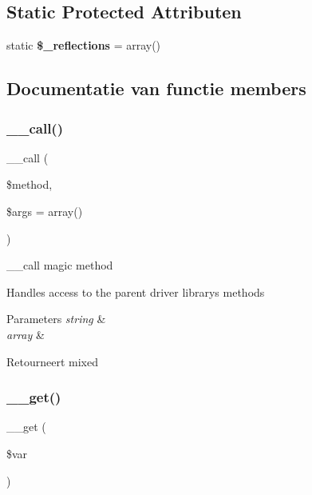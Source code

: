 \subsection*{Static Protected Attributen}
\begin{DoxyCompactItemize}
\item 
\mbox{\label{class_c_i___driver_a3eae4dfd334261dd94fe0e148501513f}} 
static {\bfseries \$\+\_\+reflections} = array()
\end{DoxyCompactItemize}


\subsection{Documentatie van functie members}
\mbox{\label{class_c_i___driver_a57936fde7f1adea3f3e7dfca474a1786}} 
\subsubsection{\texorpdfstring{\_\_call()}{\_\_call()}}
{\footnotesize\ttfamily \+\_\+\+\_\+call (\begin{DoxyParamCaption}\item[{}]{\$method,  }\item[{}]{\$args = {\ttfamily array()} }\end{DoxyParamCaption})}

\+\_\+\+\_\+call magic method

Handles access to the parent driver library\textquotesingle{}s methods


\begin{DoxyParams}{Parameters}
{\em string} & \\
\hline
{\em array} & \\
\hline
\end{DoxyParams}
\begin{DoxyReturn}{Retourneert}
mixed 
\end{DoxyReturn}
\mbox{\label{class_c_i___driver_a8fb2d9cdca17b87400e780b9f9720933}} 
\subsubsection{\texorpdfstring{\_\_get()}{\_\_get()}}
{\footnotesize\ttfamily \+\_\+\+\_\+get (\begin{DoxyParamCaption}\item[{}]{\$var }\end{DoxyParamCaption})}

